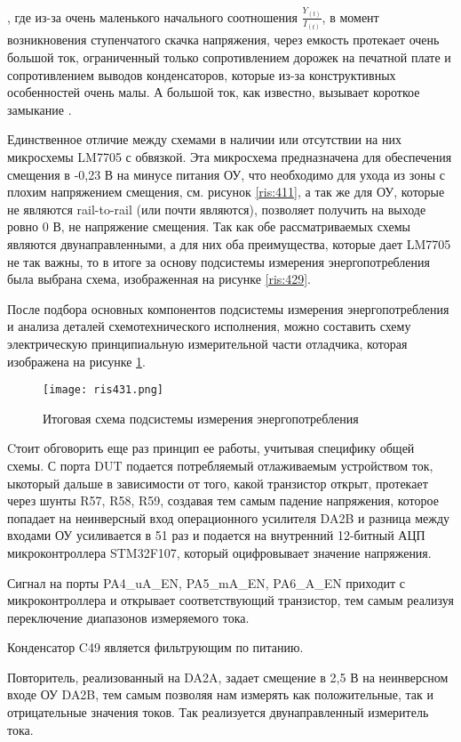 , где из-за очень маленького начального соотношения $\frac{Y_{(t)}}{I_{(t)}}$, в момент возникновения ступенчатого
скачка напряжения, через емкость протекает очень большой ток, ограниченный только сопротивлением
дорожек на печатной плате и сопротивлением выводов конденсаторов, которые из-за конструктивных особенностей очень
малы. А большой ток, как известно, вызывает короткое замыкание \cite{Howard J: Start Black Magic}.

Единственное отличие между схемами в наличии или отсутствии на них микросхемы LM7705 с обвязкой. Эта микросхема
предназначена для обеспечения смещения в -0,23 В на минусе питания ОУ, что необходимо для ухода из зоны с плохим 
напряжением смещения, см. рисунок \ref{ris:411}, а так же для ОУ, которые не являются 
rail-to-rail (или почти являются), позволяет получить на выходе ровно 0 В, не напряжение смещения. 
Так как обе рассматриваемых схемы являются двунаправленными, а для них оба преимущества, которые дает LM7705 не так 
важны, то в итоге за основу подсистемы измерения энергопотребления была выбрана схема, изображенная на рисунке 
\ref{ris:429}.

После подбора основных компонентов подсистемы измерения энергопотребления и анализа деталей схемотехнического
исполнения, можно составить схему электрическую принципиальную измерительной части отладчика, 
которая изображена на рисунке \ref{ris:431}.

\begin{figure}[H]
\centering
\texttt{[image: ris431.png]}
\caption{Итоговая схема подсистемы измерения энергопотребления}
\label{ris:431}
\end{figure}

Cтоит обговорить еще раз принцип ее работы, учитывая специфику общей схемы. 
С порта DUT подается потребляемый отлаживаемым устройством ток, ыкоторый дальше в зависимости 
от того, какой транзистор открыт, протекает через шунты R57, R58, R59, создавая тем самым падение напряжения, 
которое попадает на неинверсный вход операционного усилителя DA2B и разница между входами ОУ усиливается в 51 
раз и подается на внутренний 12-битный АЦП микроконтроллера STM32F107, который оцифровывает значение  напряжения.

Сигнал на порты PA4\_uA\_EN, PA5\_mA\_EN, PA6\_A\_EN приходит с микроконтроллера и открывает соответствующий 
транзистор, тем самым реализуя переключение диапазонов измеряемого тока.

Конденсатор C49 является фильтрующим по питанию. 

Повторитель, реализованный на DA2A, задает смещение в 2,5 В на неинверсном входе ОУ DA2B, тем самым позволяя нам 
измерять как положительные, так и отрицательные значения токов. Так реализуется двунаправленный измеритель тока. 